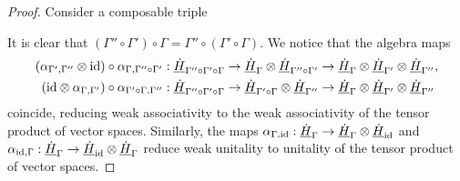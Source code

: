 \documentclass[11pt]{report}
\theoremstyle{definition}
\theoremstyle{remark}
\theoremstyle{remark}
\newcommand{\id}{\textnormal{id}}
\newcommand{\C}{\mathbb{C}}
\begin{document}
\begin{proof}
Consider a composable triple
\begin{center}
\end{center}
It is clear that $(\Gamma'' \circ \Gamma') \circ \Gamma = \Gamma'' \circ (\Gamma' \circ \Gamma)$. We notice that the algebra maps
\begin{align*}
(\alpha_{\Gamma',\Gamma''} \otimes \id) \circ \alpha_{\Gamma,\Gamma'' \circ \Gamma'}&: \underline{\dot H}_{\Gamma'' \circ \Gamma' \circ \Gamma} \to \underline{\dot H}_\Gamma \otimes \underline{\dot H}_{\Gamma'' \circ \Gamma'} \to \underline{\dot H}_\Gamma \otimes \underline{\dot H}_{\Gamma'} \otimes \underline{\dot H}_{\Gamma''}, \\
(\id \otimes \alpha_{\Gamma,\Gamma'}) \circ \alpha_{\Gamma' \circ \Gamma,\Gamma''}&: \underline{\dot H}_{\Gamma'' \circ \Gamma' \circ \Gamma} \to \underline{\dot H}_{\Gamma' \circ \Gamma} \otimes \underline{\dot H}_{\Gamma''} \to \underline{\dot H}_\Gamma \otimes \underline{\dot H}_{\Gamma'} \otimes \underline{\dot H}_{\Gamma''}
\end{align*}
coincide, reducing weak associativity to the weak associativity of the tensor product of vector spaces. Similarly, the maps $\alpha_{\Gamma,\id}: \underline{\dot H}_\Gamma \to \underline{\dot H}_\Gamma \otimes \underline{\dot H}_\id$ and $\alpha_{\id,\Gamma}: \underline{\dot H}_\Gamma \to \underline{\dot H}_\id \otimes \underline{\dot H}_\Gamma$ reduce weak unitality to unitality of the tensor product of vector spaces.
\end{proof}

\end{document}
